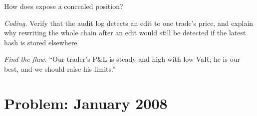 \begin{exercise}[$\star\star$]\label{exo:rc:operational-risk-and-rogue-trading:6}
How does  expose a concealed position?
\end{exercise}

\begin{exercise}[$\star\star\star$]\label{exo:rc:operational-risk-and-rogue-trading:7}
\emph{Coding.} Verify that the audit log detects an edit to one trade's price, and explain why rewriting
the whole chain after an edit would still be detected if the latest hash is stored elsewhere.
\end{exercise}

\begin{exercise}[$\star\star\star$]\label{exo:rc:operational-risk-and-rogue-trading:8}
\emph{Find the flaw.} ``Our trader's P\&L is steady and high with low VaR; he is our best, and we should raise
his limits.''
\end{exercise}

\section{Problem: January 2008}

